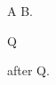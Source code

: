 \documentclass{article}
\begin{document}
A  B.

\begin{minipage}{5cm}
\parbox{3cm}{Q} after Q.
\end{minipage}
\end{document}

